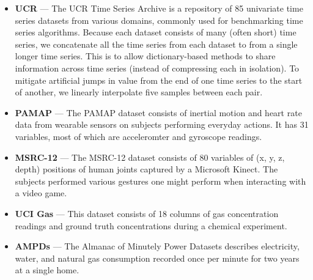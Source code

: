 \begin{itemize}[leftmargin=4mm]
\itemsep0mm
\item \textbf{UCR} \cite{ucrTimeSeries} --- The UCR Time Series Archive is a repository of 85 univariate time series datasets from various domains, commonly used for benchmarking time series algorithms. Because each dataset consists of many (often short) time series, we concatenate all the time series from each dataset to from a single longer time series. This is to allow dictionary-based methods to share information across time series (instead of compressing each in isolation). To mitigate artificial jumps in value from the end of one time series to the start of another, we linearly interpolate five samples between each pair.
\item \textbf{PAMAP} \cite{pamap} --- The PAMAP dataset consists of inertial motion and heart rate data from wearable sensors on subjects performing everyday actions. It has 31 variables, most of which are acceleromter and gyroscope readings.
\item \textbf{MSRC-12} \cite{msrc} --- The MSRC-12 dataset consists of 80 variables of (x, y, z, depth) positions of human joints captured by a Microsoft Kinect. The subjects performed various gestures one might perform when interacting with a video game.
\item \textbf{UCI Gas} \cite{uci_gas} --- This dataset consists of 18 columns of gas concentration readings and ground truth concentrations during a chemical experiment.
\item \textbf{AMPDs} \cite{ampds} --- The Almanac of Minutely Power Datasets describes electricity, water, and natural gas consumption recorded once per minute for two years at a single home. %
\end{itemize}

